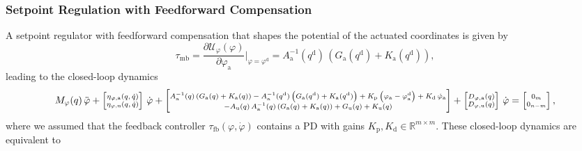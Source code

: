 \subsubsection{Setpoint Regulation with Feedforward Compensation}
A setpoint regulator with feedforward compensation that shapes the potential of the actuated coordinates is given by~\citep{pustina2025analysis}
\begin{equation}
    \tau_\mathrm{mb} = \frac{\partial \mathcal{U}_\varphi(\varphi)}{\partial \varphi_\mathrm{a}} \bigg |_{\varphi=\varphi^\mathrm{d}} = A_\mathrm{a}^{-1}(q^\mathrm{d}) \, \left ( G_\mathrm{a}(q^\mathrm{d}) + K_\mathrm{a}(q^\mathrm{d}) \right ),
\end{equation}
leading to the closed-loop dynamics
\begin{equation}\scriptsize
    M_\varphi(q) \, \ddot{\varphi} + \begin{bmatrix}
        \eta_{\varphi,\mathrm{a}}(q,\dot{q})\\ \eta_{\varphi,\mathrm{u}}(q,\dot{q})
    \end{bmatrix} \, \dot{\varphi} + \begin{bmatrix}
        A_\mathrm{a}^{-1}(q) \left ( G_\mathrm{a}(q) + K_\mathrm{a}(q) \right ) - A_\mathrm{a}^{-1}(q^\mathrm{d}) \left ( G_\mathrm{a}(q^\mathrm{d}) + K_\mathrm{a}(q^\mathrm{d}) \right ) + K_\mathrm{p} \left ( \varphi_\mathrm{a} - \varphi^\mathrm{d}_\mathrm{a} \right ) + K_\mathrm{d} \, \dot{\varphi}_\mathrm{a}\\
        -A_\mathrm{u}(q) \, A_\mathrm{a}^{-1}(q) \left ( G_\mathrm{a}(q) + K_\mathrm{a}(q) \right ) + G_\mathrm{u}(q) + K_\mathrm{u}(q)
    \end{bmatrix} + \begin{bmatrix}
        D_{\varphi,\mathrm{a}}(q)\\
        D_{\varphi,\mathrm{u}}(q)
    \end{bmatrix} \, \dot{\varphi} = \begin{bmatrix}
        0_m\\ 0_{n-m}
    \end{bmatrix},
\end{equation}
where we assumed that the feedback controller $\tau_\mathrm{fb}(\varphi,\dot{\varphi})$ contains a PD with gains $K_\mathrm{p}, K_\mathrm{d} \in \mathbb{R}^{m \times m}$.
These closed-loop dynamics are equivalent to
